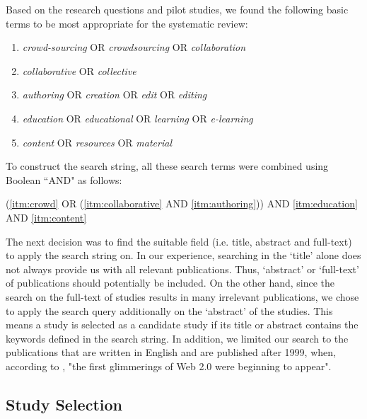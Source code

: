 \documentclass[ngerman,UKenglish,table]{scrbook}
\begin{document}
Based on the research questions and pilot studies, we found the following basic terms to be most appropriate for the systematic review:

\begin{flushleft}
\begin{enumerate}
    \setlength{\itemsep}{0pt}
    \item \label{itm:crowd} \textit{crowd-sourcing} OR \textit{crowdsourcing} OR \textit{collaboration}
	\item \label{itm:collaborative} \textit{collaborative} OR \textit{collective} 
	\item \label{itm:authoring} \textit{authoring} OR \textit{creation} OR \textit{edit} OR \textit{editing} 
	\item \label{itm:education} \textit{education} OR \textit{educational} OR \textit{learning} OR \textit{e-learning}
	\item \label{itm:content} \textit{content} OR \textit{resources} OR \textit{material} 


\end{enumerate}
\end{flushleft}

To construct the search string, all these search terms were combined using Boolean ``AND"  as follows:

\begin{center}
(\ref{itm:crowd} OR (\ref{itm:collaborative} AND \ref{itm:authoring})) AND \ref{itm:education} AND \ref{itm:content} 
\end{center}

The next decision was to find the suitable field (i.e. title, abstract and full-text) to apply the search string on.
In our experience, searching in the `title' alone does not always provide us with all relevant publications.
Thus, `abstract' or `full-text' of publications should potentially be included.
On the other hand, since the search on the full-text of studies results in many irrelevant publications, we chose to apply the search query additionally on the `abstract' of the studies.
This means a study is selected as a candidate study if its title or abstract contains the keywords defined in the search string.
In addition, we limited our search to the publications that are written in English and are published after 1999, when, according to \cite{dinucci1999design}, "the first glimmerings of Web 2.0 were beginning to appear".


\subsection{Study Selection}
\label{sec:studySelection}
\end{document}
